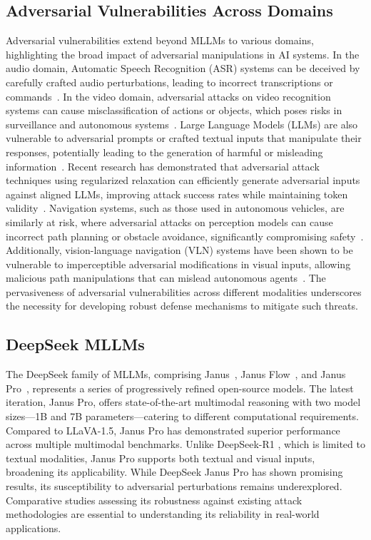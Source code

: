 \subsection{Adversarial Vulnerabilities Across Domains}
Adversarial vulnerabilities extend beyond MLLMs to various domains, highlighting the broad impact of adversarial manipulations in AI systems. In the audio domain, Automatic Speech Recognition (ASR) systems can be deceived by carefully crafted audio perturbations, leading to incorrect transcriptions or commands~\cite{carlini2018audioadversarialexamplestargeted}. In the video domain, adversarial attacks on video recognition systems can cause misclassification of actions or objects, which poses risks in surveillance and autonomous systems~\cite{jiang2019blackboxadversarialattacksvideo}. Large Language Models (LLMs) are also vulnerable to adversarial prompts or crafted textual inputs that manipulate their responses, potentially leading to the generation of harmful or misleading information~\cite{zou2023universaltransferableadversarialattacks}. Recent research has demonstrated that adversarial attack techniques using regularized relaxation can efficiently generate adversarial inputs against aligned LLMs, improving attack success rates while maintaining token validity~\cite{chacko2024adversarialattackslargelanguage}. Navigation systems, such as those used in autonomous vehicles, are similarly at risk, where adversarial attacks on perception models can cause incorrect path planning or obstacle avoidance, significantly compromising safety~\cite{mahima2021adversarial}. Additionally, vision-language navigation (VLN) systems have been shown to be vulnerable to imperceptible adversarial modifications in visual inputs, allowing malicious path manipulations that can mislead autonomous agents~\cite{islam2024maliciouspathmanipulationsexploitation}. The pervasiveness of adversarial vulnerabilities across different modalities underscores the necessity for developing robust defense mechanisms to mitigate such threats.


\subsection{DeepSeek MLLMs}
The DeepSeek family of MLLMs, comprising Janus~\cite{wu2024janus}, Janus Flow~\cite{ma2024janusflow}, and Janus Pro~\cite{chen2025janus}, represents a series of progressively refined open-source models. The latest iteration, Janus Pro, offers state-of-the-art multimodal reasoning with two model sizes—1B and 7B parameters—catering to different computational requirements. Compared to LLaVA-1.5, Janus Pro has demonstrated superior performance across multiple multimodal benchmarks. Unlike DeepSeek-R1 \cite{guo2025deepseek}, which is limited to textual modalities, Janus Pro supports both textual and visual inputs, broadening its applicability. While DeepSeek Janus Pro has shown promising results, its susceptibility to adversarial perturbations remains underexplored. Comparative studies assessing its robustness against existing attack methodologies are essential to understanding its reliability in real-world applications.